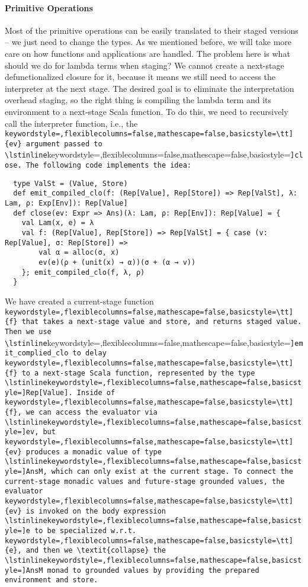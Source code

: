 \paragraph{Primitive Operations} Most of the primitive operations can be easily
translated to their staged versions -- we just need to change the types.
As we mentioned before, we will take more care on how functions and
applications are handled. The problem here is what should we do for
lambda terms when staging? We cannot create a next-stage
defunctionalized closure for it, because it means we still need to
access the interpreter at the next stage. The desired goal is to eliminate the
interpretation overhead staging, so the right thing is compiling the lambda term
and its environment to a next-stage Scala function. To do this, we need to
recursively call the interpreter function, i.e., the \lstinline[keywordstyle=,flexiblecolumns=false,mathescape=false,basicstyle=\tt]{ev} argument passed to \lstinline[keywordstyle=,flexiblecolumns=false,mathescape=false,basicstyle=\tt]{close}.
The following code implements the idea:
\begin{lstlisting}
  type ValSt = (Value, Store)
  def emit_compiled_clo(f: (Rep[Value], Rep[Store]) => Rep[ValSt], λ: Lam, ρ: Exp[Env]): Rep[Value]
  def close(ev: Expr => Ans)(λ: Lam, ρ: Rep[Env]): Rep[Value] = {
    val Lam(x, e) = λ
    val f: (Rep[Value], Rep[Store]) => Rep[ValSt] = { case (v: Rep[Value], σ: Rep[Store]) =>
        val α = alloc(σ, x)
        ev(e)(ρ + (unit(x) → α))(σ + (α → v))
    }; emit_compiled_clo(f, λ, ρ)
  }
\end{lstlisting}

We have created a current-stage function \lstinline[keywordstyle=,flexiblecolumns=false,mathescape=false,basicstyle=\tt]{f} that takes a next-stage value and
store, and returns staged value. Then we use \lstinline[keywordstyle=,flexiblecolumns=false,mathescape=false,basicstyle=\tt]{emit_complied_clo} to delay \lstinline[keywordstyle=,flexiblecolumns=false,mathescape=false,basicstyle=\tt]{f} to
a next-stage Scala function, represented by the type \lstinline[keywordstyle=,flexiblecolumns=false,mathescape=false,basicstyle=\tt]{Rep[Value]}. Inside of
\lstinline[keywordstyle=,flexiblecolumns=false,mathescape=false,basicstyle=\tt]{f}, we can access the evaluator via \lstinline[keywordstyle=,flexiblecolumns=false,mathescape=false,basicstyle=\tt]{ev}, but \lstinline[keywordstyle=,flexiblecolumns=false,mathescape=false,basicstyle=\tt]{ev} produces a monadic value of
type \lstinline[keywordstyle=,flexiblecolumns=false,mathescape=false,basicstyle=\tt]{AnsM}, which can only exist at the current stage. To connect the
current-stage monadic values and future-stage grounded values, the evaluator
\lstinline[keywordstyle=,flexiblecolumns=false,mathescape=false,basicstyle=\tt]{ev} is invoked on the body expression \lstinline[keywordstyle=,flexiblecolumns=false,mathescape=false,basicstyle=\tt]{e} to be specialized w.r.t. \lstinline[keywordstyle=,flexiblecolumns=false,mathescape=false,basicstyle=\tt]{e}, and
then we \textit{collapse} the \lstinline[keywordstyle=,flexiblecolumns=false,mathescape=false,basicstyle=\tt]{AnsM} monad to grounded values by providing the
prepared environment and store.

